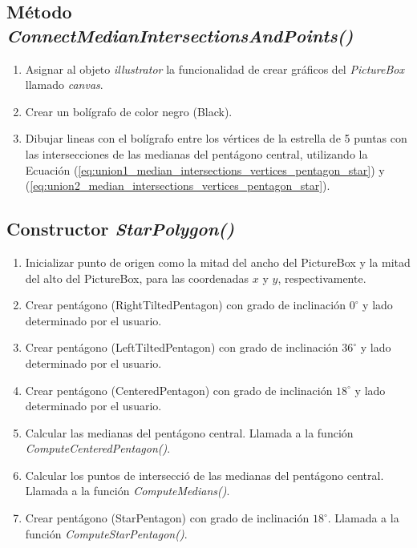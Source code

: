 \documentclass[oneside, a4paper]{article}
\begin{document}
        \subsection{Método \textit{ConnectMedianIntersectionsAndPoints()}}

            \begin{enumerate}
                \item Asignar al objeto \textit{illustrator} la funcionalidad de crear gráficos del \textit{PictureBox} llamado \textit{canvas}.
                \item Crear un bolígrafo de color negro (Black).
                \item Dibujar lineas con el bolígrafo entre los vértices de la estrella de 5 puntas con las intersecciones de las medianas del pentágono central, utilizando la Ecuación (\ref{eq:union1_median_intersections_vertices_pentagon_star}) y (\ref{eq:union2_median_intersections_vertices_pentagon_star}).
            \end{enumerate}

        \subsection{Constructor \textit{StarPolygon()}}

            \begin{enumerate}
                \item Inicializar punto de origen como la mitad del ancho del PictureBox y la mitad del alto del PictureBox, para las coordenadas $x$ y $y$, respectivamente.
                \item Crear pentágono (RightTiltedPentagon) con grado de inclinación $0^{\circ}$ y lado determinado por el usuario.
                \item Crear pentágono (LeftTiltedPentagon) con grado de inclinación $36^{\circ}$ y lado determinado por el usuario.
                \item Crear pentágono (CenteredPentagon) con grado de inclinación $18^{\circ}$ y lado determinado por el usuario.
                \item Calcular las medianas del pentágono central. Llamada a la función \textit{ComputeCenteredPentagon()}.
                \item Calcular los puntos de intersecció de las medianas del pentágono central. Llamada a la función \textit{ComputeMedians()}.
                \item Crear pentágono (StarPentagon) con grado de inclinación $18^{\circ}$. Llamada a la función \textit{ComputeStarPentagon()}.
            \end{enumerate}
\end{document}
